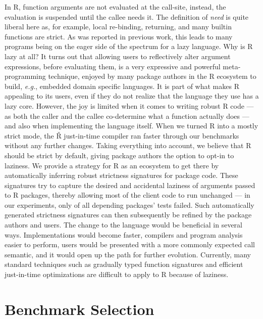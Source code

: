 \documentclass[review,creen,acmsmall]{acmart}
\renewcommand{\Rsh}{{\sf\v R}\xspace}
\newcommand{\eg}{\emph{e.g.},\xspace}
\begin{document}
In R, function arguments are not evaluated at the call-site, instead, the
evaluation is suspended until the callee needs it. The definition of
\emph{need} is quite liberal here as, for example, local re-binding, returning,
and many builtin functions are strict. As was reported in previous work, this
leads to many programs being on the eager side of the spectrum for a lazy
language. Why is R lazy at all? It turns out that allowing users to reflectively
alter argument expressions, before evaluating them, is a very expressive and
powerful meta-programming technique, enjoyed by many package authors in the R
ecosystem to build, \eg embedded domain specific languages. It is part of
what makes R appealing to its users, even if they do not realize that the
language they use has a lazy core. However, the joy is limited when it comes to
writing robust R code --- as both the caller and the callee co-determine what a function
actually does --- and also when implementing the language itself. When we turned
R into a mostly strict mode, the \Rsh just-in-time compiler ran
\speedupRshStrict faster through our benchmarks without any further changes.
Taking everything into account, we believe that R should be strict by default,
giving package authors the option to opt-in to laziness. We provide a strategy
for R as an ecosystem to get there by automatically inferring robust strictness
signatures for package code. These signatures try to capture the desired and
accidental laziness of arguments passed to R packages, thereby allowing most of
the client code to run unchanged --- in our experiments, only \robustnesResult of
all depending packages' tests failed. Such automatically generated strictness
signatures can then subsequently be refined by the package authors and users.
The change to the language would be beneficial in several ways. Implementations
would become faster, compilers and program analysis easier to perform, users
would be presented with a more commonly expected call semantic, and it would open
up the path for further evolution. Currently, many standard techniques such as
gradually typed function signatures and efficient just-in-time optimizations are
difficult to apply to R because of laziness.



\appendix

\section{Benchmark Selection}
\end{document}
